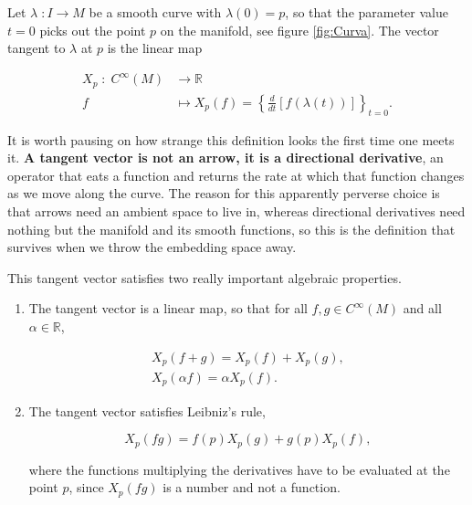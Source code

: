         \begin{myDef}
            Let $\lambda\;: I \rightarrow M$ be a smooth curve with $\lambda(0) = p$, so that the parameter value $t=0$ picks out the point $p$ on the manifold, see figure \ref{fig:Curva}. The vector tangent to $\lambda$ at $p$ is the linear map

            \begin{equation}
                \begin{split}
                    X_p\;:\;C^{\infty}(M) &\longrightarrow \mathbb{R}\\
                    f &\longmapsto X_p(f) = \left\{\frac{d}{dt}\left[f(\lambda(t))\right]\right\}_{t=0}.
                \end{split}
            \end{equation}
        \end{myDef}

        It is worth pausing on how strange this definition looks the first time one meets it. \textbf{A tangent vector is not an arrow, it is a directional derivative}, an operator that eats a function and returns the rate at which that function changes as we move along the curve. The reason for this apparently perverse choice is that arrows need an ambient space to live in, whereas directional derivatives need nothing but the manifold and its smooth functions, so this is the definition that survives when we throw the embedding space away.

        This tangent vector satisfies two really important algebraic properties.

        \begin{enumerate}
            \item The tangent vector is a linear map, so that for all $f,g \in C^{\infty}(M)$ and all $\alpha \in \mathbb{R}$,

            \begin{align}
                X_p(f+g) = X_p(f) + X_p(g),\\
                X_p(\alpha f) = \alpha X_p(f).
            \end{align}

            \item The tangent vector satisfies Leibniz's rule,

            \begin{equation}\label{eq:LeibnizXp}
                X_p(fg) = f(p) X_p(g) + g(p) X_p(f),
            \end{equation}

            where the functions multiplying the derivatives have to be evaluated at the point $p$, since $X_p(fg)$ is a number and not a function.
        \end{enumerate}

